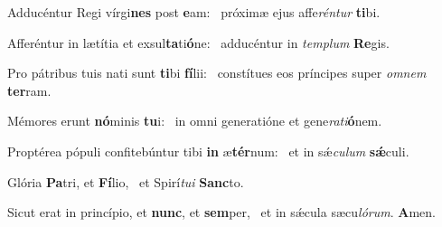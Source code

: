 \item Adducéntur Regi vírgi\textbf{nes} post \textbf{e}am:~\psstar{} próximæ ejus affe\textit{rén}\textit{tur} \textbf{ti}bi.
\item Afferéntur in lætítia et exsul\textbf{ta}ti\textbf{ó}ne:~\psstar{} adducéntur in \textit{tem}\textit{plum} \textbf{Re}gis.
\item Pro pátribus tuis nati sunt \textbf{ti}bi \textbf{fí}lii:~\psstar{} constítues eos príncipes super \textit{om}\textit{nem} \textbf{ter}ram.
\item Mémores erunt \textbf{nó}minis \textbf{tu}i:~\psstar{} in omni generatióne et gene\textit{ra}\textit{ti}\textbf{ó}nem.
\item Proptérea pópuli confitebúntur tibi \textbf{in} æ\textbf{tér}num:~\psstar{} et in sǽ\textit{cu}\textit{lum} \textbf{sǽ}culi.
\item Glória \textbf{Pa}tri, et \textbf{Fí}lio,~\psstar{} et Spirí\textit{tu}\textit{i} \textbf{Sanc}to.
\item Sicut erat in princípio, et \textbf{nunc}, et \textbf{sem}per,~\psstar{} et in sǽcula sæcu\textit{ló}\textit{rum}. \textbf{A}men.
